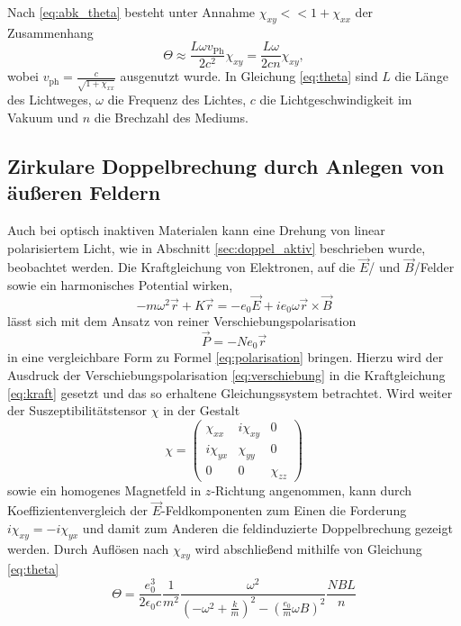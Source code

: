 Nach \eqref{eq:abk_theta} besteht unter Annahme $\chi_{xy} << 1 + \chi_{xx}$ der Zusammenhang
\begin{equation}
    \Theta \approx \frac{L\omega v_\text{Ph}}{2c^2}\chi_{xy} = \frac{L\omega}{2cn}\chi_{xy},
    \label{eq:theta}
\end{equation}
wobei $v_\text{ph} = \frac{c}{\sqrt{1+\chi_{xx}}}$ ausgenutzt wurde.
In Gleichung \eqref{eq:theta} sind $L$ die Länge des Lichtweges, $\omega$ die Frequenz des Lichtes, $c$ die Lichtgeschwindigkeit im Vakuum und $n$ die Brechzahl des Mediums.
\subsection{Zirkulare Doppelbrechung durch Anlegen von äußeren Feldern}
Auch bei optisch inaktiven Materialen kann eine Drehung von linear polarisiertem Licht, wie in Abschnitt \ref{sec:doppel_aktiv} beschrieben wurde, beobachtet werden.
Die Kraftgleichung von Elektronen, auf die $\vec E$\-/ und $\vec B$\-/Felder sowie ein harmonisches Potential wirken,
\begin{equation}
    -m\omega^2\vec r + K \vec r = -e_0 \vec E + i e_0 \omega \vec r \times \vec B
    \label{eq:kraft}
\end{equation}
lässt sich mit dem Ansatz von reiner Verschiebungspolarisation
\begin{equation}
    \vec P = - N e_0 \vec r
    \label{eq:verschiebung}
\end{equation}
in eine vergleichbare Form zu Formel \eqref{eq:polarisation} bringen.
Hierzu wird der Ausdruck der Verschiebungspolarisation \eqref{eq:verschiebung} in die Kraftgleichung \eqref{eq:kraft} gesetzt und das so erhaltene Gleichungssystem betrachtet.
Wird weiter der Suszeptibilitätstensor $\chi$ in der Gestalt
\begin{equation}
    \chi = \begin{pmatrix} \chi_{xx} & i\chi_{xy} & 0 \\ i\chi_{yx} & \chi_{yy} & 0\\ 0 & 0 & \chi_{zz} \end{pmatrix}
\end{equation}
sowie ein homogenes Magnetfeld in $z$-Richtung angenommen, kann durch Koeffizientenvergleich der $\vec E$-Feldkomponenten zum Einen die Forderung $i\chi_{xy}=-i\chi_{yx}$ und damit zum Anderen die feldinduzierte Doppelbrechung gezeigt werden.
Durch Auflösen nach $\chi_{xy}$ wird abschließend mithilfe von Gleichung \eqref{eq:theta}
\begin{equation}
    \Theta = \frac{e_0^3}{2\epsilon_0 c}\frac{1}{m^2} \frac{\omega^2}{(-\omega^2+\frac{k}{m})^2-(\frac{e_0}{m}\omega B)^2} \frac{NBL}{n}
    \label{theta_1}
\end{equation}
